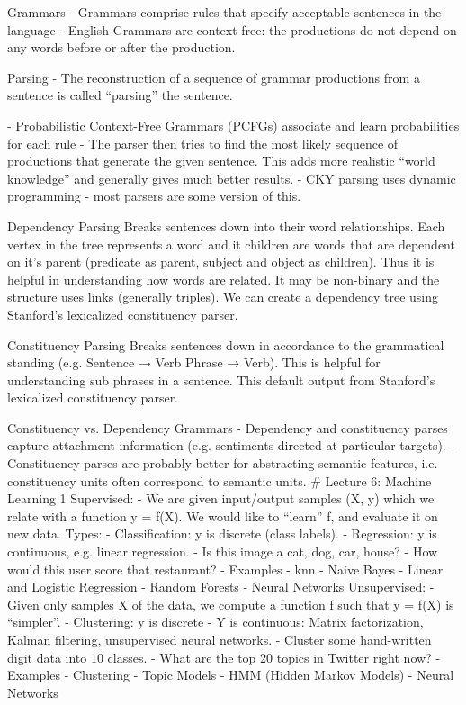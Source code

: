 \documentclass[3pt,landscape]{article}
\begin{document}
\begin{multicols}{3}
Grammars
- Grammars comprise rules that specify acceptable sentences in the language
- English Grammars are context-free: the productions do not depend on any words before or after the production.

Parsing
- The reconstruction of a sequence of grammar productions from a sentence is called “parsing” the sentence. 

- Probabilistic Context-Free Grammars (PCFGs) associate and learn probabilities for each rule
- The parser then tries to find the most likely sequence of productions that generate the given sentence. This adds more realistic “world knowledge” and generally gives much better results. 
- CKY parsing uses dynamic programming - most parsers are some version of this. 

Dependency Parsing
Breaks sentences down into their word relationships. Each vertex in the tree represents a word and it children are words that are dependent on it’s parent (predicate as parent, subject and object as children). Thus it is helpful in understanding how words are related.  It may be non-binary and the structure uses links (generally triples). We can create a dependency tree using Stanford’s lexicalized constituency parser. 

Constituency Parsing
Breaks sentences down in accordance to the grammatical standing (e.g. Sentence → Verb Phrase → Verb). This is helpful for understanding sub phrases in a sentence. This default output from Stanford’s lexicalized constituency parser.

Constituency vs. Dependency Grammars
- Dependency and constituency parses capture attachment information (e.g. sentiments directed at particular targets).
- Constituency parses are probably better for abstracting semantic features, i.e. constituency units often correspond to semantic units. 
\# Lecture 6: Machine Learning 1
Supervised: 
- We are given input/output samples (X, y) which we relate with a function y = f(X). We would like to “learn” f, and evaluate it on new data. Types:
  - Classification: y is discrete (class labels).
  - Regression: y is continuous, e.g. linear regression.
  - Is this image a cat, dog, car, house?
  - How would this user score that restaurant? 
  - Examples
    - knn
    - Naive Bayes
    - Linear and Logistic Regression
    - Random Forests
    - Neural Networks
Unsupervised:
-  Given only samples X of the data, we compute a function f such that y = f(X) is “simpler”.
  - Clustering: y is discrete
  - Y is continuous: Matrix factorization, Kalman filtering, unsupervised neural networks. 
  - Cluster some hand-written digit data into 10 classes.
  - What are the top 20 topics in Twitter right now?
  - Examples
    - Clustering
    - Topic Models
    - HMM (Hidden Markov Models)
    - Neural Networks


\end{multicols}
\end{document}
